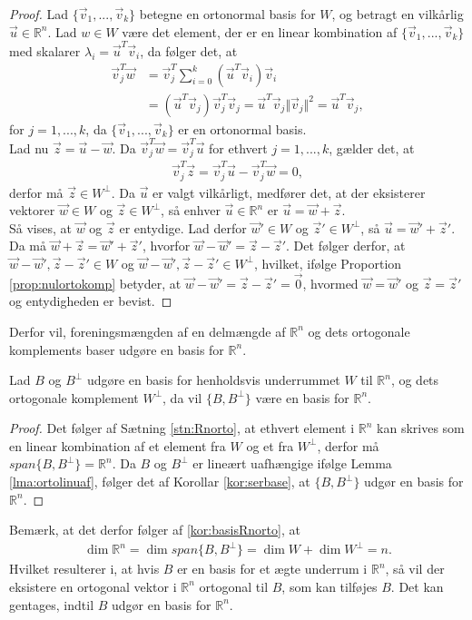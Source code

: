 \begin{proof}
Lad $\{\vec{v}_1,...,\vec{v}_k\}$ betegne en ortonormal basis for $W$, og betragt en vilkårlig $\vec{u} \in \mathds{R}^n$. 
Lad $w \in W$ være det element, der er en linear kombination af $\{\vec{v}_1,...,\vec{v}_k\}$ med skalarer $\lambda_i = \vec{u}^T\vec{v}_i$, da følger det, at
\begin{align*}
\vec{v}_j^T\vec{w} &= \vec{v}_j^T\sum_{i=0}^k(\vec{u}^T\vec{v}_i)\vec{v}_i
\\ & = (\vec{u}^T\vec{v}_j)\vec{v}_j^T\vec{v}_j = \vec{u}^T\vec{v}_j \Vert \vec{v}_j \Vert^2 = \vec{u}^T\vec{v}_j,
\end{align*}
for $j=1,...,k$, da $\{\vec{v}_1,...,\vec{v}_k\}$ er en ortonormal basis.
\\ Lad nu $\vec{z} = \vec{u}- \vec{w}$.
Da $\vec{v}_j^T\vec{w}= \vec{v}_j^T\vec{u}$ for ethvert $j=1,...,k$, gælder det, at 
\begin{align*}
\vec{v}_j^T\vec{z} = \vec{v}_j^T\vec{u}- \vec{v}_j^T\vec{w} = 0,
\end{align*}
derfor må $\vec{z} \in W^{\bot}$. 
Da $\vec{u}$ er valgt vilkårligt, medfører det, at der eksisterer vektorer $\vec{w} \in W$ og $\vec{z} \in W^{\bot}$, så enhver $\vec{u} \in \mathds{R}^n$ er $\vec{u}= \vec{w}+\vec{z}$.
\\Så vises, at $\vec{w}$ og $\vec{z}$ er entydige.
Lad derfor $\vec{w}' \in W$ og $\vec{z}' \in W^{\bot}$, så $\vec{u}= \vec{w}' + \vec{z}'$.
Da må $\vec{w} + \vec{z} = \vec{w}' + \vec{z}'$, hvorfor $\vec{w}-\vec{w}' = \vec{z}-\vec{z}'$.
Det følger derfor, at $\vec{w}-\vec{w}', \vec{z}-\vec{z}' \in W$ og $\vec{w}-\vec{w}', \vec{z}-\vec{z}' \in W^{\bot}$, hvilket, ifølge Proportion \ref{prop:nulortokomp} betyder, at $\vec{w}-\vec{w}' = \vec{z}-\vec{z}' = \vec{0}$, hvormed $\vec{w}= \vec{w}'$ og $\vec{z}=\vec{z}'$ og entydigheden er bevist.
\end{proof}
Derfor vil, foreningsmængden af en delmængde af $\mathds{R}^n$ og dets ortogonale komplements baser udgøre en basis for $\mathds{R}^n$.
\begin{kor}
Lad $B$  og $B^{\bot}$ udgøre en basis for henholdsvis underrummet $W$ til $\mathds{R}^n$, og dets ortogonale komplement $W^{\bot}$, da vil $\{B, B^{\bot}\}$ være en basis for $\mathds{R}^n$.
\label{kor:basisRnorto}
\end{kor}
\begin{proof}
Det følger af Sætning \ref{stn:Rnorto}, at ethvert element i $\mathds{R}^n$ kan skrives som en linear kombination af et element fra $W$ og et fra $W^{\bot}$, derfor må $span\{B, B^{\bot}\} = \mathds{R}^n$. 
Da $B$ og $B^{\bot}$ er lineært uafhængige ifølge Lemma \ref{lma:ortolinuaf}, følger det af Korollar \ref{kor:serbase}, at $\{B, B^{\bot}\}$ udgør en basis for $\mathds{R}^n$.
\end{proof}
Bemærk, at det derfor følger af \ref{kor:basisRnorto}, at
\begin{align}
\dim{\mathds{R}^n} = \dim{span\{B, B^{\bot}\}} = \dim{W} + \dim{W^{\bot}} = n.
\end{align}
Hvilket resulterer i, at hvis $B$ er en basis for et ægte underrum i $\mathds{R}^n$, så vil der eksistere en ortogonal vektor i $\mathds{R}^n$ ortogonal til $B$, som kan tilføjes $B$. 
Det kan gentages, indtil $B$ udgør en basis for $\mathds{R}^n$.
